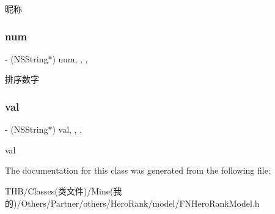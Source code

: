 昵称 \mbox{\label{interface_f_n_hero_rank_model_a59d91becba9411fe85cae3bfc68c9e54}} 
\subsubsection{\texorpdfstring{num}{num}}
{\footnotesize\ttfamily -\/ (N\+S\+String$\ast$) num\hspace{0.3cm}{\ttfamily [read]}, {\ttfamily [write]}, {\ttfamily [nonatomic]}, {\ttfamily [copy]}}

排序数字 \mbox{\label{interface_f_n_hero_rank_model_a3a9bd79e2a68baa0cd096f903674f577}} 
\subsubsection{\texorpdfstring{val}{val}}
{\footnotesize\ttfamily -\/ (N\+S\+String$\ast$) val\hspace{0.3cm}{\ttfamily [read]}, {\ttfamily [write]}, {\ttfamily [nonatomic]}, {\ttfamily [copy]}}

val 

The documentation for this class was generated from the following file\+:\begin{DoxyCompactItemize}
\item 
T\+H\+B/\+Classes(类文件)/\+Mine(我的)/\+Others/\+Partner/others/\+Hero\+Rank/model/F\+N\+Hero\+Rank\+Model.\+h\end{DoxyCompactItemize}
